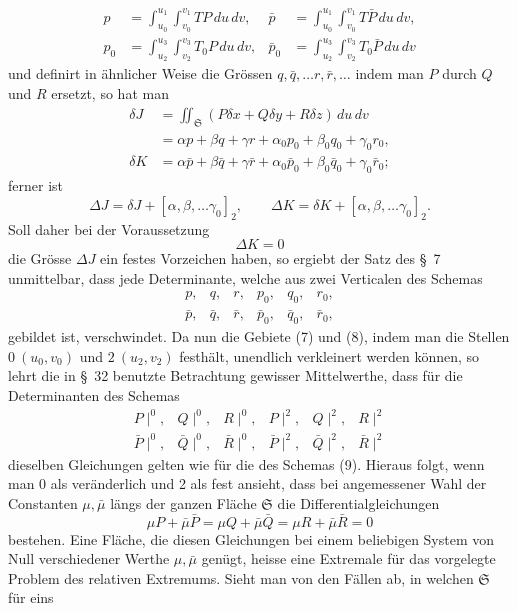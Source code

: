 \documentclass[11pt,a4paper,leqno]{article}
\begin{document}
\[
\begin{aligned}
p&=\int_{u_0}^{u_1}\!\int_{v_0}^{v_1}TP\,du\,dv,
&\bar p&=\int_{u_0}^{u_1}\!\int_{v_0}^{v_1}T\bar P\,du\,dv,\\
p_0&=\int_{u_2}^{u_3}\!\int_{v_2}^{v_3}T_0P\,du\,dv,
&\bar p_0&=\int_{u_2}^{u_3}\!\int_{v_2}^{v_3}T_0\bar P\,du\,dv
\end{aligned}
\]
und definirt in ähnlicher Weise die Grössen $q,\bar q,\ldots r,\bar r,\ldots$
indem man $P$ durch $Q$ und $R$ ersetzt, so hat man
\[
\begin{aligned}
\delta J
&=\iint_{\mathfrak{S}}(P\delta x+Q\delta y+R\delta z)\,du\,dv\\
&=\alpha p+\beta q+\gamma r+\alpha_0p_0+\beta_0q_0+\gamma_0r_0,\\
\delta K
&=\alpha\bar p+\beta\bar q+\gamma\bar r
+\alpha_0\bar p_0+\beta_0\bar q_0+\gamma_0\bar r_0;
\end{aligned}
\]
ferner ist
\[
\Delta J=\delta J+[\alpha,\beta,\ldots\gamma_0]_2,
\qquad
\Delta K=\delta K+[\alpha,\beta,\ldots\gamma_0]_2.
\]
Soll daher bei der Voraussetzung
\[
\Delta K=0
\]
die Grösse $\Delta J$ ein festes Vorzeichen haben, so ergiebt der Satz
des \S~7 unmittelbar, dass jede Determinante, welche aus zwei
Verticalen des Schemas
\begin{equation}\tag{9}
\begin{array}{cccccc}
p,&q,&r,&p_0,&q_0,&r_0,\\
\bar p,&\bar q,&\bar r,&\bar p_0,&\bar q_0,&\bar r_0,
\end{array}
\end{equation}
gebildet ist, verschwindet. Da nun die Gebiete (7) und (8), indem
man die Stellen $0\ (u_0,v_0)$ und $2\ (u_2,v_2)$ festhält, unendlich
verkleinert werden können, so lehrt die in \S~32 benutzte Betrachtung
gewisser Mittelwerthe, dass für die Determinanten des Schemas
\[
\begin{array}{cccccc}
P\!\mid^0,&Q\!\mid^0,&R\!\mid^0,&P\!\mid^2,&Q\!\mid^2,&R\!\mid^2\\
\bar P\!\mid^0,&\bar Q\!\mid^0,&\bar R\!\mid^0,
&\bar P\!\mid^2,&\bar Q\!\mid^2,&\bar R\!\mid^2
\end{array}
\]
dieselben Gleichungen gelten wie für die des Schemas (9). Hieraus
folgt, wenn man 0 als veränderlich und 2 als fest ansieht,
dass bei angemessener Wahl der Constanten $\mu,\bar\mu$ längs der
ganzen Fläche $\mathfrak{S}$ die Differentialgleichungen
\[
\mu P+\bar\mu\bar P
=\mu Q+\bar\mu\bar Q
=\mu R+\bar\mu\bar R=0
\]
bestehen. Eine Fläche, die diesen Gleichungen bei einem beliebigen
System von Null verschiedener Werthe $\mu,\bar\mu$ genügt, heisse
eine Extremale für das vorgelegte Problem des relativen Extremums.
Sieht man von den Fällen ab, in welchen $\mathfrak{S}$ für eins
\end{document}
